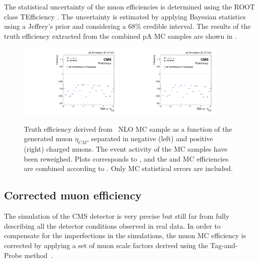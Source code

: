 The statistical uncertainty of the muon efficiencies is determined using the ROOT class TEfficiency \cite{ROOT}. The uncertainty is estimated by applying Bayesian statistics using a Jeffrey's prior and considering a 68$\%$ credible interval. The results of the \WToMuNu truth efficiency extracted from the combined pA MC samples are shown in .

\begin{figure}[htb!]
 \begin{center}
   \includegraphics[width=0.45\textwidth]{Figures/WBoson/Analysis/Efficiency/Muon/PA/eff1D_EtaCM_MC_WToMuNu_PA_Minus_Total_HFCorrOnly}
   \includegraphics[width=0.45\textwidth]{Figures/WBoson/Analysis/Efficiency/Muon/PA/eff1D_EtaCM_MC_WToMuNu_PA_Plus_Total_HFCorrOnly}
 \end{center}
 \caption{Truth efficiency derived from \WToMuNu\ NLO MC sample as a function of the generated muon $\eta_{CM}$, separated in negative (left) and positive (right) charged muons. The event activity of the MC samples have been reweighed. Plots corresponds to , and the \RunpPb and \RunPbp MC efficiencies are combined according to . Only MC statistical errors are included.}
 \label{fig:MCTruthEfficiency}
\end{figure}

\subsection{Corrected muon efficiency}\label{sec:WBoson_Efficiency_CorrectedEfficiency}

The simulation of the CMS detector is very precise but still far from fully describing all the detector conditions observed in real data. In order to compensate for the imperfections in the simulations, the muon MC efficiency is corrected by applying a set of muon scale factors derived using the Tag-and-Probe method~\cite{Muon_TnP}.

